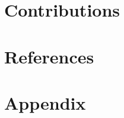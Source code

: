\documentclass{article}
\begin{document}
\section{Contributions}
\label{sec:contributions}

\section{References}
\label{sec:references}

\section{Appendix}
\label{sec:appendix}
\end{document}
